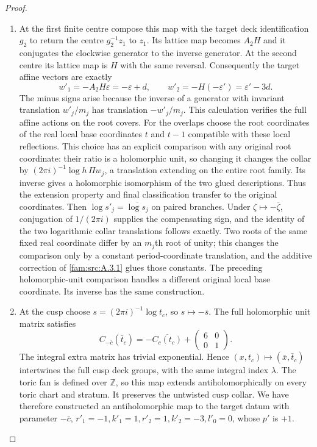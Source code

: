 \begin{proof}
\begin{enumerate}[label=\arabic*.,leftmargin=*]
\item At the first finite centre compose this map with the target deck identification $g_2$ to return the centre $g_2^{-1}z_1$ to $z_1$. Its lattice map becomes $A_2H$ and it conjugates the clockwise generator to the inverse generator. At the second centre its lattice map is $H$ with the same reversal. Consequently the target affine vectors are exactly
\begin{equation}
 w'_1=-A_2H\varepsilon=-\varepsilon+d,\qquad
 w'_2=-H(-\varepsilon')=\varepsilon'-3d.
 \label{I:eq:real-reflected-affine-data}
\end{equation}
The minus signs arise because the inverse of a generator with invariant translation $w'_j/m_j$ has translation $-w'_j/m_j$. This calculation verifies the full affine actions on the root covers. For the overlaps choose the root coordinates of the real local base coordinates $t$ and $t-1$ compatible with these local reflections. This choice has an explicit comparison with any original root coordinate: their ratio is a holomorphic unit, so changing it changes the collar by $(2\pi i)^{-1}\log h\,\Pi w_j$, a translation extending on the entire root family. Its inverse gives a holomorphic isomorphism of the two glued descriptions. Thus the extension property and final classification transfer to the original coordinates. Then $\log s'_j=\overline{\log s_j}$ on paired branches. Under $\zeta\mapsto-\bar\zeta$, conjugation of $1/(2\pi i)$ supplies the compensating sign, and the identity of the two logarithmic collar translations follows exactly. Two roots of the same fixed real coordinate differ by an $m_j$th root of unity; this changes the comparison only by a constant period-coordinate translation, and the additive correction of \ref{fam:src:A.3.1} glues those constants. The preceding holomorphic-unit comparison handles a different original local base coordinate. Its inverse has the same construction.

\item At the cusp choose $s=(2\pi i)^{-1}\log t_c$, so $s\mapsto-\bar s$. The full holomorphic unit matrix satisfies
\[
 C_{-\bar c}(\bar t_c)=-\overline{C_c(t_c)}+
       \begin{pmatrix}6&0\\0&1\end{pmatrix}.
\]
The integral extra matrix has trivial exponential. Hence $(x,t_c)\mapsto(\bar x,\bar t_c)$ intertwines the full cusp deck groups, with the same integral index $\lambda$. The toric fan is defined over $\mathbb Z$, so this map extends antiholomorphically on every toric chart and stratum. It preserves the untwisted cusp collar. We have therefore constructed an antiholomorphic map to the target datum with parameter $-\bar c$, $r'_1=-1,k'_1=1,r'_2=1,k'_2=-3,l'_0=0$, whose $p'$ is $+1$.


\end{enumerate}
\end{proof}
